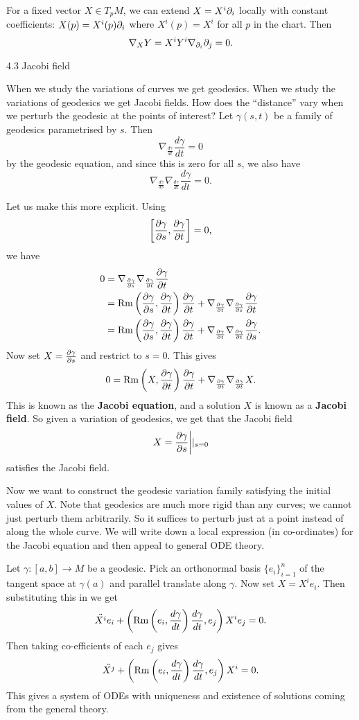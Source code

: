 For a fixed vector $X\in T_pM$, we can extend $X=X^i\partial_i$ locally with constant coefficients: $X(p)=X^i(p)\partial_i$ where $X^i(p)=X^i$ for all $p$ in the chart.
Then
\[ \nabla_XY= X^iY^i\nabla_{\partial_i}\partial_j=0. \]

4.3 Jacobi field

When we study the variations of curves we get geodesics.
When we study the variations of geodesics we get Jacobi fields.
How does the ``distance'' vary when we perturb the geodesic at the points of interest?
Let $\gamma(s,t)$ be a family of geodesics parametrised by $s$.
Then
\[ \nabla_{\frac{d\gamma}{dt}}\frac{d\gamma}{dt} = 0 \]
by the geodesic equation, and since this is zero for all $s$, we also have
\[ \nabla_{\frac{d\gamma}{ds}} \nabla_{\frac{d\gamma}{dt}}\frac{d\gamma}{dt} = 0. \]

Let us make this more explicit.
Using
\[ \left[ \frac{\partial\gamma}{\partial s}, \frac{\partial\gamma}{\partial t} \right] = 0,\]
we have
\begin{align*}
  0 &= \nabla_{\frac{\partial\gamma}{\partial s}} \nabla_{\frac{\partial\gamma}{\partial t}}\frac{\partial \gamma}{\partial t} \\
  &= \operatorname{Rm}\left( \frac{\partial \gamma}{\partial s}, \frac{\partial \gamma}{\partial t} \right) \frac{\partial \gamma}{\partial t} + \nabla_{\frac{\partial\gamma}{\partial t}} \nabla_{\frac{\partial\gamma}{\partial s}} \frac{\partial \gamma}{\partial t} \\
  &= \operatorname{Rm}\left( \frac{\partial \gamma}{\partial s}, \frac{\partial \gamma}{\partial t} \right) \frac{\partial \gamma}{\partial t} + \nabla_{\frac{\partial\gamma}{\partial t}} \nabla_{\frac{\partial\gamma}{\partial t}} \frac{\partial \gamma}{\partial s}.
\end{align*}
Now set $X=\tfrac{\partial\gamma}{\partial s}$ and restrict to $s=0$.
This gives
\[ 0 = \operatorname{Rm}\left( X, \frac{\partial \gamma}{\partial t} \right) \frac{\partial \gamma}{\partial t} + \nabla_{\frac{\partial\gamma}{\partial t}} \nabla_{\frac{\partial\gamma}{\partial t}} X.\]
This is known as the \textbf{Jacobi equation}, and a solution $X$ is known as a \textbf{Jacobi field}.
So given a variation of geodesics, we get that the Jacobi field
\[ X = \frac{\partial\gamma}{\partial s}\bigg\vert|_{s=0} \]
satisfies the Jacobi field.

Now we want to construct the geodesic variation family satisfying the initial values of $X$.
Note that geodesics are much more rigid than any curves; we cannot just perturb them arbitrarily.
So it suffices to perturb just at a point instead of along the whole curve.
We will write down a local expression (in co-ordinates) for the Jacobi equation and then appeal to general ODE theory.

Let $\gamma:[a,b]\to M$ be a geodesic.
Pick an orthonormal basis $\{e_i\}_{i=1}^n$ of the tangent space at $\gamma(a)$ and parallel translate along $\gamma$.
Now set $X=X^ie_i$.
Then substituting this in we get
\[ \ddot{X^i} e_i + \left( \operatorname{Rm}\left( e_i, \frac{d\gamma}{dt} \right)\frac{d\gamma}{dt}, e_j \right)X^ie_j = 0. \]
Then taking co-efficients of each $e_j$ gives
\[ \ddot{X^j} + \left( \operatorname{Rm}\left( e_i, \frac{d\gamma}{dt} \right)\frac{d\gamma}{dt}, e_j \right)X^i = 0. \]
This gives a system of ODEs with uniqueness and existence of solutions coming from the general theory.

